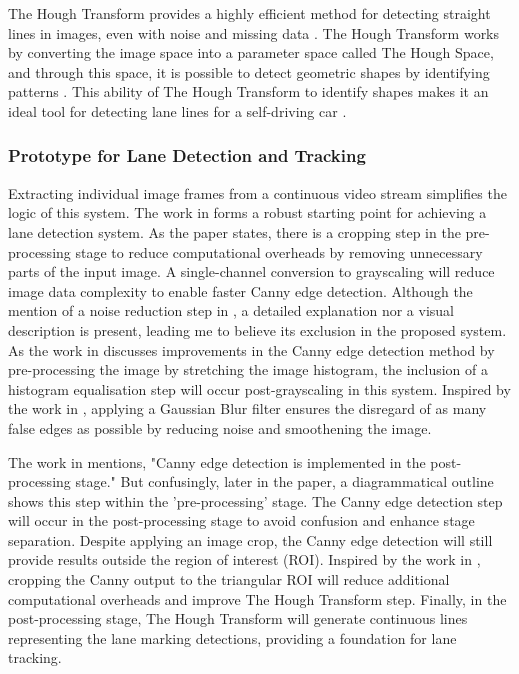 \documentclass[10pt,conference]{IEEEtran}
\begin{document}
The Hough Transform provides a highly efficient method for detecting straight lines in images, even with noise and missing data \cite{b4}. The Hough Transform works by converting the image space into a parameter space called The Hough Space, and through this space, it is possible to detect geometric shapes by identifying patterns \cite{b5}. This ability of The Hough Transform to identify shapes makes it an ideal tool for detecting lane lines for a self-driving car \cite{b6}.

\subsubsection{Prototype for Lane Detection and Tracking}

Extracting individual image frames from a continuous video stream simplifies the logic of this system. The work in \cite{b3} forms a robust starting point for achieving a lane detection system. As the paper states, there is a cropping step in the pre-processing stage to reduce computational overheads by removing unnecessary parts of the input image. A single-channel conversion to grayscaling will reduce image data complexity to enable faster Canny edge detection. Although the mention of a noise reduction step in \cite{b3}, a detailed explanation nor a visual description is present, leading me to believe its exclusion in the proposed system. As the work in \cite{b7} discusses improvements in the Canny edge detection method by pre-processing the image by stretching the image histogram, the inclusion of a histogram equalisation step will occur post-grayscaling in this system. Inspired by the work in \cite{b6}, applying a Gaussian Blur filter ensures the disregard of as many false edges as possible by reducing noise and smoothening the image.

The work in \cite{b3} mentions, "Canny edge detection is implemented in the post-processing stage." But confusingly, later in the paper, a diagrammatical outline shows this step within the 'pre-processing' stage. The Canny edge detection step will occur in the post-processing stage to avoid confusion and enhance stage separation. Despite applying an image crop, the Canny edge detection will still provide results outside the region of interest (ROI). Inspired by the work in \cite{b6}, cropping the Canny output to the triangular ROI will reduce additional computational overheads and improve The Hough Transform step. Finally, in the post-processing stage, The Hough Transform will generate continuous lines representing the lane marking detections, providing a foundation for lane tracking.
\end{document}
